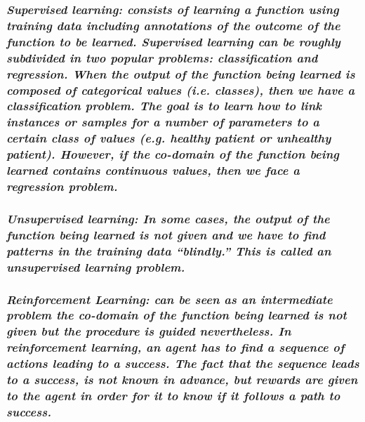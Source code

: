 \subsubsection{\emph{Supervised learning: consists of learning a function using
training data including annotations of the outcome of the function to be learned.
Supervised learning can be roughly subdivided in two
popular problems:
\emph{classification} and \emph{regression}. When the output of the function
being learned is composed of categorical values (i.e. classes), then we have a
classification problem. The goal is to learn how to link instances or samples
for a number of parameters to a certain class of values (e.g. healthy patient or
unhealthy patient). However, if the co-domain of the function being learned
contains continuous values, then we face a regression problem.}} 

\subsubsection{\emph{Unsupervised learning: In some cases, the output of the
function being learned is not given and we have to find patterns in the training data ``blindly.'' This is called an
\emph{unsupervised} learning problem. }}

\subsubsection{\emph{Reinforcement Learning: can be seen as an intermediate
problem the co-domain of the function being learned is not given but the procedure is guided
nevertheless. In reinforcement learning, an agent has to find a sequence of
actions leading to a success. The fact that the sequence leads to a success, is
not known in advance, but rewards are given to the agent in order for it to know
if it follows a path to success. }}

